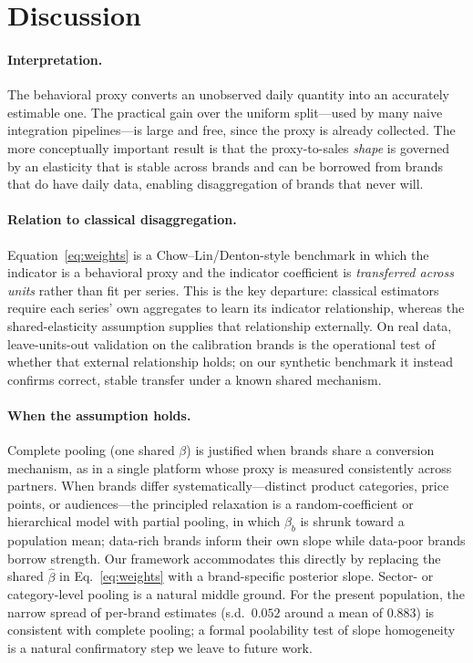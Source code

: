 \documentclass[11pt]{article}
\begin{document}
\section{Discussion}\label{sec:discussion}

\paragraph{Interpretation.}
The behavioral proxy converts an unobserved daily quantity into an accurately
estimable one. The practical gain over the uniform split---used by many naive
integration pipelines---is large and free, since the proxy is already collected.
The more conceptually important result is that the proxy-to-sales \emph{shape}
is governed by an elasticity that is stable across brands and can be borrowed
from brands that do have daily data, enabling disaggregation of brands that
never will.

\paragraph{Relation to classical disaggregation.}
Equation~\eqref{eq:weights} is a Chow--Lin/Denton-style benchmark in which the
indicator is a behavioral proxy and the indicator coefficient is
\emph{transferred across units} rather than fit per series. This is the key
departure: classical estimators require each series' own aggregates to learn its
indicator relationship, whereas the shared-elasticity assumption supplies that
relationship externally. On real data, leave-units-out validation on the
calibration brands is the operational test of whether that external relationship
holds; on our synthetic benchmark it instead confirms correct, stable transfer
under a known shared mechanism.

\paragraph{When the assumption holds.}
Complete pooling (one shared $\beta$) is justified when brands share a conversion
mechanism, as in a single platform whose proxy is measured consistently across
partners. When brands differ systematically---distinct product categories,
price points, or audiences---the principled relaxation is a random-coefficient
or hierarchical model \citep{Swamy1970,GelmanHill2006} with partial pooling, in
which $\beta_b$ is shrunk toward a population mean; data-rich brands inform their
own slope while data-poor brands borrow strength. Our framework accommodates
this directly by replacing the shared $\hat\beta$ in Eq.~\eqref{eq:weights} with
a brand-specific posterior slope. Sector- or category-level pooling is a natural
middle ground. For the present population, the narrow spread of per-brand
estimates (s.d.\ $0.052$ around a mean of $0.883$) is consistent with complete
pooling; a formal poolability test of slope homogeneity \citep{Swamy1970} is a
natural confirmatory step we leave to future work.
\end{document}
